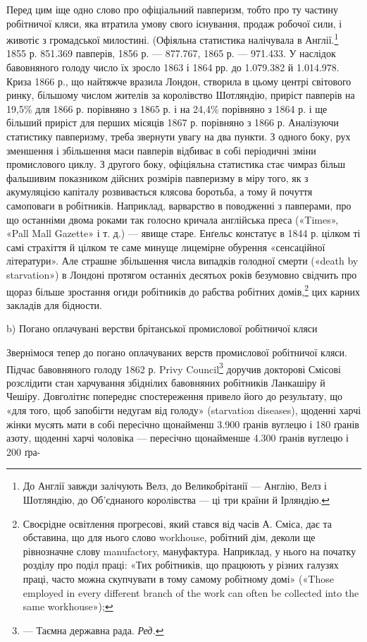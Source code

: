 Перед цим іще одно слово про офіціальний павперизм, тобто
про ту частину робітничої кляси, яка втратила умову свого існування,
продаж робочої сили, і животіє з громадської милостині.
(Офіяльна статистика налічувала в Англії.\footnote{
До Англії завжди залічують Велз, до Великобрітанії — Англію,
Велз і Шотляндію, до Об’єднаного королівства — ці три країни й Ірляндію.
} 1855 р. 851.369 павперів,
1856 р. — 877.767, 1865 р. — 971.433. У наслідок бавовняного
голоду число їх зросло 1863 і 1864 рр. до 1.079.382
й 1.014.978. Криза 1866 р., що найтяжче вразила Лондон, створила
в цьому центрі світового ринку, більшому числом жителів
за королівство Шотляндію, приріст павперів на 19,5\% для
1866 р. порівняно з 1865 р. і на 24,4\% порівняно з 1864 р. і ще
більший приріст для перших місяців 1867 р. порівняно з
1866 р. Аналізуючи статистику павперизму, треба звернути увагу
на два пункти. З одного боку, рух зменшення і збільшення маси
павперів відбиває в собі періодичні зміни промислового циклу.
З другого боку, офіціяльна статистика стає чимраз більш фальшивим
показником дійсних розмірів павперизму в міру того,
як з акумуляцією капіталу розвивається клясова боротьба, а
тому й почуття самоповаги в робітників. Наприклад, варварство
в поводженні з павперами, про що останніми двома роками так
голосно кричала англійська преса («Times», «Pall Mall Gazette»
і т. д.) — явище старе. Енґельс констатує в 1844 р. цілком
ті самі страхіття й цілком те саме минуще лицемірне обурення
«сенсаційної літератури». Але страшне збільшення числа випадків
голодної смерти («death by starvation») в Лондоні протягом
останніх десятьох років безумовно свідчить про щораз більше зростання
огиди робітників до рабства робітних домів,\footnote{
Своєрідне освітлення прогресові, який стався від часів А. Сміса,
дає та обставина, що для нього слово workhouse, робітний дім, деколи ще
рівнозначне слову manufactory, мануфактура. Наприклад, у нього на
початку розділу про поділ праці: «Тих робітників, що працюють у різних
галузях праці, часто можна скупчувати в тому самому робітному домі»
(«Those employed in every different branch of the work can often be collected
into the same workhouse»);
} цих карних
закладів для бідности.

b) Погано оплачувані верстви брітанської промислової робітничої кляси

Звернімося тепер до погано оплачуваних верств промислової
робітничої кляси. Підчас бавовняного голоду 1862 р. Privy
Council\footnote*{
— Таємна державна рада. \emph{Ред.}
} доручив докторові Смісові розслідити стан харчування
збіднілих бавовняних робітників Ланкашіру й Чешіру. Довголітнє
попереднє спостереження привело його до результату, що
«для того, щоб запобігти недугам від голоду» (starvation diseases),
щоденні харчі жінки мусять мати в собі пересічно щонайменш
3.900 ґранів вуглецю і 180 ґранів азоту, щоденні харчі
чоловіка — пересічно щонайменше 4.300 ґранів вуглецю і 200 ґра-
\parbreak{}  %
